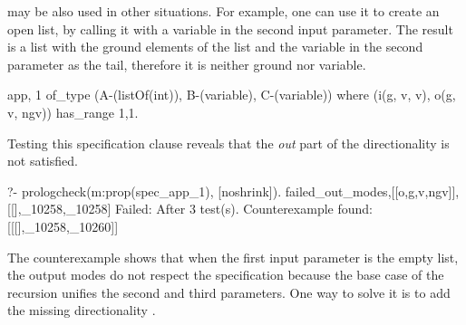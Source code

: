 may be %
also
used in other situations.
%
For example, one can use it to create an open list, by %
calling it with a variable in the second input parameter.
%
The result is a list with the ground elements of the list and the
variable in the second parameter as the tail, therefore it is neither ground nor
variable.
%
\begin{yapcode}
 {app, 1} of_type (A-(listOf(int)), B-(variable), C-(variable))
   where (i(g, v, v), o(g, v, ngv))  has_range {1,1}.
\end{yapcode}
%
Testing this specification clause reveals that the \emph{out} part of
the directionality is not satisfied.
\begin{yapcode}
  ?- prologcheck(m:prop(spec_app_1), [noshrink]).
 {failed_out_modes,[[o,g,v,ngv]], [[],_10258,_10258]}
 Failed: After 3 test(s).
 Counterexample found: [[[],_10258,_10260]] 
\end{yapcode}
%
The counterexample shows that when the first input parameter is the empty
list, %
the output modes do not respect %
the specification %
because
the base case of the recursion
unifies the second and third parameters.
%
One way to solve it 
is to add the missing directionality .
%



